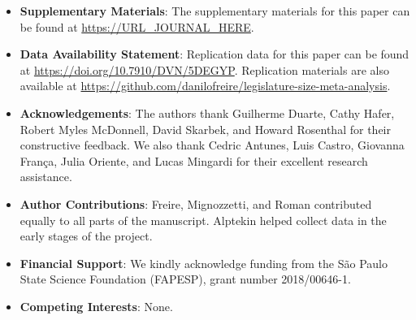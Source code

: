 \documentclass[11pt,a4paper,]{article}
\begin{document}
\begin{itemize}
\item
  \textbf{Supplementary Materials}: The supplementary materials for this
  paper can be found at \url{https://URL_JOURNAL_HERE}.
\item
  \textbf{Data Availability Statement}: Replication data for this paper
  can be found at \url{https://doi.org/10.7910/DVN/5DEGYP}. Replication
  materials are also available at
  \url{https://github.com/danilofreire/legislature-size-meta-analysis}.
\item
  \textbf{Acknowledgements}: The authors thank Guilherme Duarte, Cathy
  Hafer, Robert Myles McDonnell, David Skarbek, and Howard Rosenthal for
  their constructive feedback. We also thank Cedric Antunes, Luis
  Castro, Giovanna França, Julia Oriente, and Lucas Mingardi for their
  excellent research assistance.
\item
  \textbf{Author Contributions}: Freire, Mignozzetti, and Roman
  contributed equally to all parts of the manuscript. Alptekin helped
  collect data in the early stages of the project.
\item
  \textbf{Financial Support}: We kindly acknowledge funding from the São
  Paulo State Science Foundation (FAPESP), grant number 2018/00646-1.
\item
  \textbf{Competing Interests}: None.
\end{itemize}

\newpage
\setlength{\parindent}{0cm}
\setlength{\parskip}{5pt}

\nocite{datasetCite, baskaran2013coalition, bradbury2009spatially, drew2017price,
erler2007termlimits, fiorino2007legislature, hohmann2017effect,
kessler2014communication, lewis2019legislature, lledo2003electoral,
mukherjee2003politicalparties, petterssonlidbom2012size, schaltegger2009large,
stein1998institutional, mukherjee2003politicalparties, macdonald2008impact,
matsusaka2005endogeneity, ricciuti2004legislatures, coate2011government}


\end{document}
